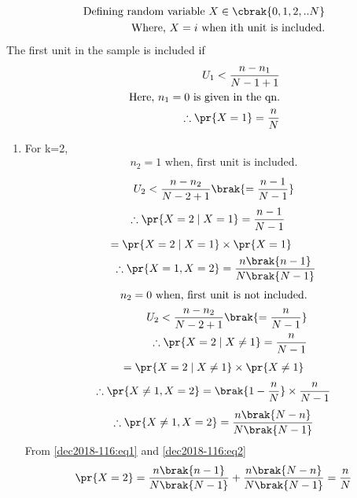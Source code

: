 \begin{align}
\text{Defining random variable }X\in\cbrak{0, 1, 2, ..N}
\\\text{Where, } X = i \text{ when ith unit is included.}
\end{align}
The first unit in the sample is included if
\begin{align}
    U_1 < \frac{n-n_1}{N-1+1}  
    \\\text{Here, } n_1=0 \text{ is given in the qn.}
    \\\therefore \pr{X=1} = \frac{n}{N}
\end{align}
\begin{enumerate}
    \item For k=2, 
\begin{align}
    n_2 = 1 \text{ when, first unit is included.}
\end{align}
\begin{align}
    U_2 < \frac{n-n_2}{N-2+1} \brak{ = \frac{n-1}{N-1}}
\end{align}
\begin{align}
    \therefore \pr{X=2 \mid X=1} &= \frac{n-1}{N-1}
\end{align}
\begin{align}
     = \pr{X=2 \mid X=1} &\times \pr{X=1}
    \\\therefore \pr{X=1, X=2} &= \frac{n \brak{n-1}}{N \brak{N-1}} \label{dec2018-116:eq1}
\end{align}
\begin{align}
    n_2 = 0 \text{ when, first unit is not included.}
    \\U_2 < \frac{n-n_2}{N-2+1} \brak{= \frac{n}{N-1}}
    \\\therefore \pr{X=2 \mid X\neq 1} = \frac{n}{N-1}
\end{align}
\begin{align}
     = \pr{X=2 \mid X\neq1} \times \pr{X\neq1}
\end{align}
\begin{align}
    \therefore \pr{X\neq1,X=2} = \brak{1-\frac{n}{N}}\times\frac{n}{N-1}
\end{align}
\begin{align}
    \therefore \pr{X\neq1,X=2} = \frac{n \brak{N-n}}{N \brak{N-1}} \label{dec2018-116:eq2}
\end{align}
From \eqref{dec2018-116:eq1} and \eqref{dec2018-116:eq2}
\begin{align}
    \pr{X=2} = \frac{n \brak{n-1}}{N \brak{N-1}} + \frac{n \brak{N-n}}{N \brak{N-1}} = \frac{n}{N}

\end{align}
\end{enumerate}

